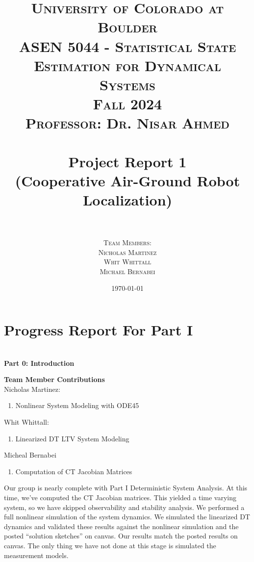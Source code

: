 \documentclass[paper=a4, fontsize=11pt]{scrartcl} %
\title{
\normalfont \LARGE
\textsc{University of Colorado at Boulder} \\ [25pt] %
\textsc{ASEN 5044 - Statistical State Estimation for Dynamical Systems} \\ [20pt]
\textsc{Fall 2024} \\ [20pt]
\textsc{Professor: Dr. Nisar Ahmed} \\ [12pt]
\horrule{1pt} \\[0.4cm] %
\huge Project Report 1 \\ %
\huge (Cooperative Air-Ground Robot Localization) \\ 
\horrule{1pt} \\[0.6cm] %
}
\author{
  \textsc{ Team Members:} \\ [4 mm]
  \textsc{ Nicholas Martinez}\\[2mm]
  \textsc{ Whit Whittall } \\[2mm]
  \textsc{ Michael Bernabei}\\[2mm]
}
\date{\normalsize\today} %
\numberwithin{equation}{section} %
\numberwithin{figure}{section} %
\numberwithin{table}{section} %
\begin{document}
\maketitle %
\thispagestyle{empty} %
\newpage

\tableofcontents



\newpage

%
\section{Progress Report For Part I}
\textbf{\\ Part 0: Introduction}
\begin{framed}

\textbf{Team Member Contributions} \\
Nicholas Martinez:
\begin{enumerate}
    \item Nonlinear System Modeling with ODE45
\end{enumerate}
Whit Whittall:
\begin{enumerate}
    \item Linearized DT LTV System Modeling
\end{enumerate}
Micheal Bernabei
\begin{enumerate}
    \item Computation of CT Jacobian Matrices
\end{enumerate}

Our group is nearly complete with Part I Deterministic System Analysis. At this time, we’ve computed the CT Jacobian matrices. This yielded a time varying system, so we have skipped observability and stability analysis. We performed a full nonlinear simulation of the system dynamics. We simulated the linearized DT dynamics and validated these results against the nonlinear simulation and the posted “solution sketches” on canvas. Our results match the posted results on canvas. The only thing we have not done at this stage is simulated the measurement models.

\end{framed}

\newpage
\end{document}
